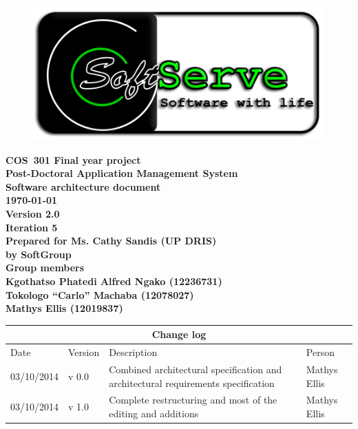\documentclass[12pt]{article}
\newcommand{\Title}{Software architecture document} %
\newcommand{\Class}{COS\ 301 Final year project} %
\newcommand{\ssr}{Soft\color{green}{Serve }\color{black}}
\newcommand{\version}{2.0}
\newcommand{\iteration}{5}
\newcommand{\client}{Ms. Cathy Sandis (UP DRIS)}
\newcommand{\project}{Post-Doctoral Application Management System}
\begin{document}
\vspace{4em}

\begin{center}%

\begin{figure}[ht!]
\centering
\includegraphics{../Images_Docs/logo.png}
\end{figure}
\LARGE \bf \Class \\[0.25em]
\LARGE \bf \project \\[1em]
\LARGE \bf \Title \\[0.25em]
\large \bf \today\\
\bf Version \version\\
\bf Iteration \iteration\\[0.5em]
\Large \bf Prepared for \client\\
\Large \bf by
\Large {\bf \ssr Group }\\[0.5em]
\LARGE {\bf Group members}\\[0.25em]
\large
Kgothatso Phatedi Alfred Ngako (12236731) \\[0.5em]
Tokologo “Carlo” Machaba (12078027) \\[0.5em]
Mathys Ellis (12019837) \\[8em]

\end{center}%


\begin{center}
\begin{tabular}{|l|p{1.4cm}|p{8cm}|p{2.8cm}|}
\hline
\multicolumn{4}{|c|}{\bf Change log} \\
\hline
 Date & Version & Description &  Person \\
\hline
03/10/2014 & v 0.0 & Combined architectural specification and architectural requirements specification & Mathys Ellis \\
\hline
03/10/2014 & v 1.0 & Complete restructuring and most of the editing and additions  & Mathys Ellis \\
\hline

\end{tabular}
\end{center}
\newpage
\tableofcontents
\end{document}
